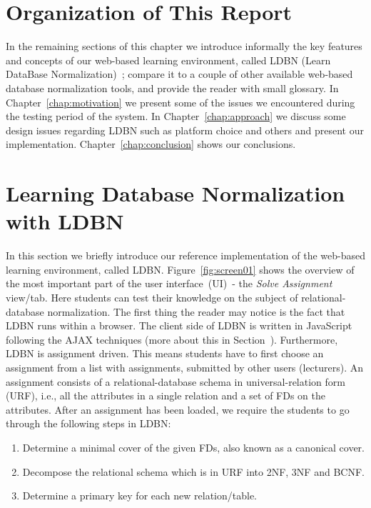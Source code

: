 \section{Organization of This Report}
\label{sec:organization}
In the remaining sections of this chapter we introduce informally 
the key features and concepts of our web-based learning environment, 
called LDBN (Learn DataBase Normalization)~\cite{wldbn}; 
compare it to a couple of other 
available web-based database normalization tools, and provide the reader with small glossary.  
In Chapter~\ref{chap:motivation} we present some of the issues we encountered during the testing period
of the system. 
In Chapter~\ref{chap:approach} we discuss some design issues regarding LDBN such as 
platform choice and others and present our implementation.  
Chapter~\ref{chap:conclusion} shows our conclusions.

\section{Learning Database Normalization with LDBN}
\label{sec:introldbn}
In this section we briefly introduce our reference implementation
of the web-based learning environment, called LDBN.    
Figure~\ref{fig:screen01} shows the overview of the most important part of the 
user interface~(UI)~- 
the \textit{Solve Assignment} view/tab. Here students can test their knowledge on 
the subject of relational-database normalization. The first thing the reader 
may notice is the fact that LDBN runs within a browser. The client side 
of LDBN is written in JavaScript following the AJAX techniques 
(more about this in Section~\cite{sec:platform}). 
Furthermore, LDBN is assignment driven. This means students have to first 
choose an assignment 
from a list with assignments, submitted by other users (lecturers). 
An assignment consists of a relational-database schema in
universal-relation form (URF), i.e., all the attributes in a single relation 
and a set of FDs on the attributes. 
After an assignment has been loaded, we require the students to go through the 
following steps in LDBN:
\begin{enumerate}
	\item Determine a minimal cover of the given FDs, also known as a canonical cover.
	\item Decompose the relational schema which is in URF into 2NF, 3NF and BCNF. 
	\item Determine a primary key for each new relation/table. 
\end{enumerate}

